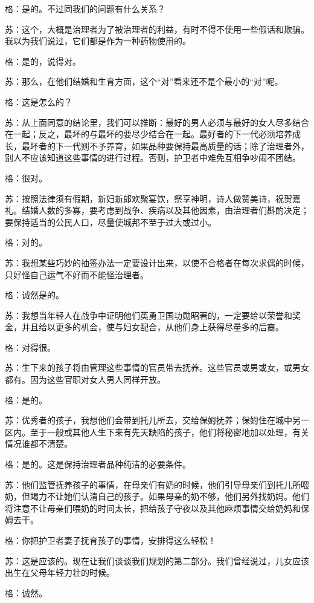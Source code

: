 \documentclass[12pt,oneside]{book}
\begin{document}
格：是的。不过同我们的问题有什么关系？

苏：这个，大概是治理者为了被治理者的利益，有时不得不使用一些假话和欺骗。我以为我们说过，它们都是作为一种药物使用的。

格：是的，说得对。

苏：那么，在他们结婚和生育方面，这个“对”看来还不是个最小的“对”呢。

格：这是怎么的？

苏：从上面同意的结论里，我们可以推断：最好的男人必须与最好的女人尽多结合在一起；反之，最坏的与最坏的要尽少结合在一起。最好者的下一代必须培养成长，最坏者的下一代则不予养育，如果品种要保持最高质量的话；除了治理者外，别人不应该知道这些事情的进行过程。否则，护卫者中难免互相争吵闹不团结。

格：很对。

苏：按照法律须有假期，新妇新郎欢聚宴饮，祭享神明，诗人做赞美诗，祝贺嘉礼。结婚人数的多寡，要考虑到战争、疾病以及其他因素，由治理者们斟酌决定；要保持适当的公民人口，尽量使城邦不至于过大或过小。

格：对的。

苏：我想某些巧妙的抽签办法一定要设计出来，以使不合格者在每次求偶的时候，只好怪自己运气不好而不能怪治理者。

格：诚然是的。

苏：我想当年轻人在战争中证明他们英勇卫国功勋昭著的，一定要给以荣誉和奖金，并且给以更多的机会，使与妇女配合，从他们身上获得尽量多的后裔。

格：对得很。

苏：生下来的孩子将由管理这些事情的官员带去抚养。这些官员或男或女，或男女都有。因为这些官职对女人男人同样开放。

格：是的。

苏：优秀者的孩子，我想他们会带到托儿所去，交给保姆抚养；保姆住在城中另一区内。至于一般或其他人生下来有先天缺陷的孩子，他们将秘密地加以处理，有关情况谁都不清楚。

格：是的。这是保持治理者品种纯洁的必要条件。

苏：他们监管抚养孩子的事情，在母亲们有奶的时候，他们引导母亲们到托儿所喂奶，但竭力不让她们认清自己的孩子。如果母亲的奶不够，他们另外找奶妈。他们将注意不让母亲们喂奶的时间太长，把给孩子守夜以及其他麻烦事情交给奶妈和保姆去干。

格：你把护卫者妻子抚育孩子的事情，安排得这么轻松！

苏：这是应该的。现在让我们谈谈我们规划的第二部分。我们曾经说过，儿女应该出生在父母年轻力壮的时候。

格：诚然。
\end{document}
